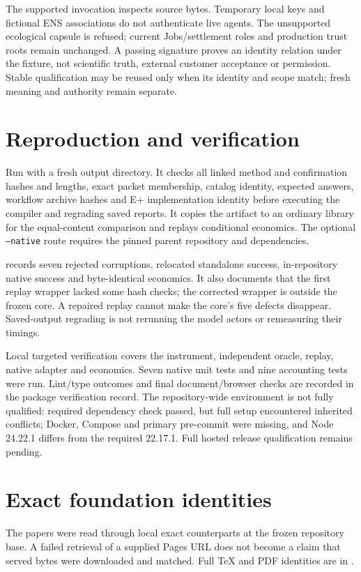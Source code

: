 \documentclass[10pt]{article}
\begin{document}
The supported invocation inspects source bytes. Temporary local keys and fictional ENS associations do not authenticate live agents. The unsupported ecological capsule is refused; current Jobs/settlement roles and production trust roots remain unchanged. A passing signature proves an identity relation under the fixture, not scientific truth, external customer acceptance or permission. Stable qualification may be reused only when its identity and scope match; fresh meaning and authority remain separate.

\section{Reproduction and verification}
Run  with a fresh output directory. It checks all linked method and confirmation hashes and lengths, exact packet membership, catalog identity, expected answers, workflow archive hashes and E+ implementation identity before executing the compiler and regrading saved reports. It copies the artifact to an ordinary library for the equal-content comparison and replays conditional economics. The optional \texttt{--native} route requires the pinned parent repository and dependencies.

 records seven rejected corruptions, relocated standalone success, in-repository native success and byte-identical economics. It also documents that the first replay wrapper lacked some hash checks; the corrected wrapper is outside the frozen core. A repaired replay cannot make the core's five defects disappear. Saved-output regrading is not rerunning the model actors or remeasuring their timings.

Local targeted verification covers the instrument, independent oracle, replay, native adapter and economics. Seven native unit tests and nine accounting tests were run. Lint/type outcomes and final document/browser checks are recorded in the package verification record. The repository-wide environment is not fully qualified: required dependency check passed, but full setup encountered inherited conflicts; Docker, Compose and primary pre-commit were missing, and Node 24.22.1 differs from the required 22.17.1. Full hosted release qualification remains pending.

\section{Exact foundation identities}
The papers were read through local exact counterparts at the frozen repository base. A failed retrieval of a supplied Pages URL does not become a claim that served bytes were downloaded and matched. Full TeX and PDF identities are in .
\end{document}
